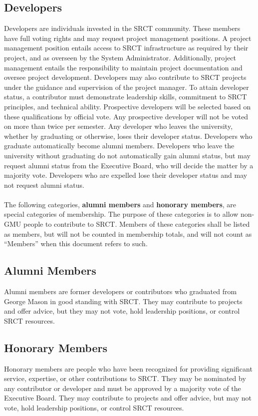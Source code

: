 \documentclass{article}
\begin{document}
  \subsection{Developers}
  Developers are individuals invested in the SRCT community. These 
  members have full voting rights and may request project management 
  positions. A project management position entails access to SRCT 
  infrastructure as required by their project, and as overseen by the
  System Administrator. Additionally, project management entails the
  responsibility to maintain project documentation and oversee project
  development. Developers may also contribute to SRCT projects under 
  the guidance and supervision of the project manager. To attain 
  developer status, a contributor must demonstrate leadership skills, 
  commitment to SRCT principles, and technical ability. Prospective 
  developers will be selected based on these qualifications by official 
  vote. Any prospective developer will not be voted on more than twice 
  per semester.
  Any developer who leaves the university, whether by graduating or otherwise,
  loses their developer status. Developers who graduate automatically become
  alumni members. Developers who leave the university without graduating
  do not automatically gain alumni status, but may request alumni status
  from the Executive Board, who will decide the matter by a majority vote.
  Developers who are expelled lose their developer status and may not request
  alumni status.
  \\ \\
  The following categories, \textbf{alumni members} and
  \textbf{honorary members}, are special categories of membership. The
  purpose of these categories is to allow non-GMU people to contribute to
  SRCT. Members of these categories shall be listed as members, but will
  not be counted in membership totals, and will not count as ``Members'' when
  this document refers to such.

  \subsection{Alumni Members}
  Alumni members are former developers or contributors who graduated
  from George Mason in good standing with SRCT. They may contribute to
  projects and offer advice, but they may not vote, hold leadership
  positions, or control SRCT resources.

  \subsection{Honorary Members}
  Honorary members are people who have been recognized for providing
  significant service, expertise, or other contributions to SRCT. They
  may be nominated by any contributor or developer and must be approved
  by a majority vote of the Executive Board. They may contribute to projects
  and offer advice, but may not vote, hold leadership positions, or control
  SRCT resources.
\end{document}
